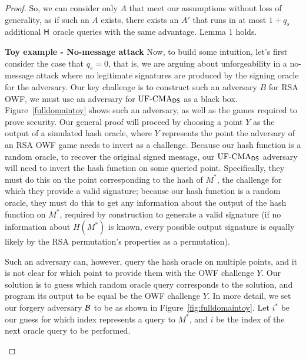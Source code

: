 \begin{proof}
So, we can consider only $A$ that meet our assumptions without loss of generality, as if such an $A$ exists, there exists an $A'$ that runs in at most $1+q_s$ additional $\mathsf{H}$ oracle queries with the same advantage.  Lemma 1 holds.

\textbf{Toy example - No-message attack} Now, to build some intuition, let's first consider the case that $q_s = 0$, that is, 
we are arguing about unforgeability in a no-message attack where no legitimate signatures are produced by the signing oracle for the adversary.  Our key challenge is to construct such an adversary $B$ for RSA OWF, we must use an adversary for $\textnormal{UF-CMA}_{{\mathsf{DS}}}$ as a black box.  Figure~\ref{fulldomaintoy} shows such an adversary, as well as the games required to prove security.  Our general proof will proceed by choosing a point $Y$ as the output of a simulated hash oracle, where $Y$ represents the point the adversary of an RSA OWF game needs to invert as a challenge.  Because our hash function is a random oracle, to recover the original signed message, our $\textnormal{UF-CMA}_{{\mathsf{DS}}}$ adversary will need to invert the hash function on some queried point.  Specifically, they must do this on the point corresponding to the hash of $M^*$, the challenge for which they provide a valid signature; because our hash function is a random oracle, they must do this to get any information about the output of the hash function on $M^*$, required by construction to generate a valid signature (if no information about $H(M^*)$ is known, every possible output signature is equally likely by the RSA permutation's properties as a permutation).

Such an adversary can, however, query the hash oracle on multiple points, and it is not clear for which point to provide them with the OWF challenge $Y$.  
Our solution is to 
guess which random oracle query corresponds to the solution, and program its
output to be equal be the OWF challenge $Y$.  In more detail, we set our forgery
adversary ${\mathcal B}$ to be as shown in Figure~\ref{fig:fulldomaintoy}.  Let $i^*$ be our guess for which index represents a query to $M^*$, and $i$ be the index of the next oracle query to be performed.

\begin{figure}
\centering
{}
\end{figure}
\end{proof}
